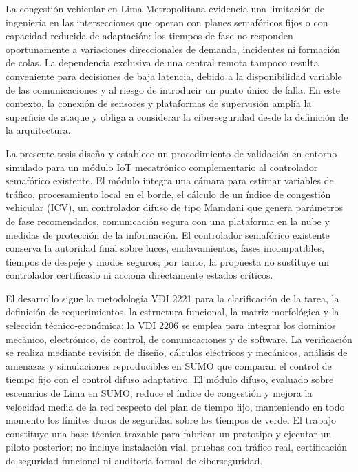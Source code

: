\documentclass[12pt,a4paper,oneside]{report}
\numberwithin{figure}{chapter}
\numberwithin{table}{chapter}
\numberwithin{equation}{chapter}
\DeclareRobustCommand{\%}{\ifmmode\text{\char37\relax}\else\char37\relax\fi}%
\begin{document}
La congestión vehicular en Lima Metropolitana evidencia una limitación de ingeniería en las intersecciones
que operan con planes semafóricos fijos o con capacidad reducida de adaptación: los tiempos de fase no
responden oportunamente a variaciones direccionales de demanda, incidentes ni formación de colas. La
dependencia exclusiva de una central remota tampoco resulta conveniente para decisiones de baja latencia,
debido a la disponibilidad variable de las comunicaciones y al riesgo de introducir un punto único de
falla. En este contexto, la conexión de sensores y plataformas de supervisión amplía la superficie de
ataque y obliga a considerar la ciberseguridad desde la definición de la arquitectura.

La presente tesis diseña y establece un procedimiento de validación en entorno simulado para un módulo IoT
mecatrónico complementario al controlador semafórico existente. El módulo integra una cámara para estimar
variables de tráfico, procesamiento local en el borde, el cálculo de un índice de congestión vehicular
(ICV), un controlador difuso de tipo Mamdani que genera parámetros de fase recomendados, comunicación
segura con una plataforma en la nube y medidas de protección de la información. El controlador semafórico
existente conserva la autoridad final sobre luces, enclavamientos, fases incompatibles, tiempos de despeje
y modos seguros; por tanto, la propuesta no sustituye un controlador certificado ni acciona directamente
estados críticos.

El desarrollo sigue la metodología VDI 2221 para la clarificación de la tarea, la definición de
requerimientos, la estructura funcional, la matriz morfológica y la selección técnico-económica; la VDI
2206 se emplea para integrar los dominios mecánico, electrónico, de control, de comunicaciones y de
software. La verificación se realiza mediante revisión de diseño, cálculos eléctricos y mecánicos, análisis
de amenazas y simulaciones reproducibles en SUMO que comparan el control de tiempo fijo con el control
difuso adaptativo. El módulo difuso, evaluado sobre escenarios de Lima en SUMO, reduce el índice de
congestión y mejora la velocidad media de la red respecto del plan de tiempo fijo, manteniendo en todo
momento los límites duros de seguridad sobre los tiempos de verde. El trabajo constituye una base técnica
trazable para fabricar un prototipo y ejecutar un piloto posterior; no incluye instalación vial, pruebas
con tráfico real, certificación de seguridad funcional ni auditoría formal de ciberseguridad.
\end{document}
